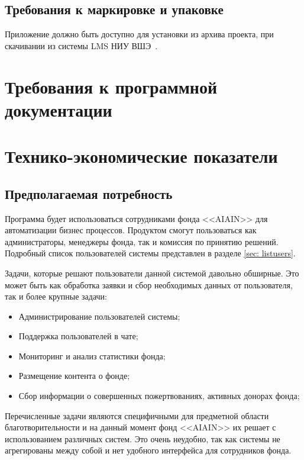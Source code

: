 \documentclass[a4paper,12pt,reqno]{article}
\begin{document}
	\subsection{Требования к маркировке и упаковке}
	Приложение должно быть доступно для установки из архива проекта, при скачивании из системы LMS НИУ ВШЭ~\cite{lms}.
	
						\newpage
	\section{Требования к программной документации}
    
	
						\newpage
	\section{Технико-экономические показатели}
	\subsection{Предполагаемая потребность}
	
	Программа будет использоваться сотрудниками фонда <<AIAIN>> для автоматизации бизнес процессов.  Продуктом смогут пользоваться как администраторы, менеджеры фонда, так и комиссия по принятию решений. Подробный список пользователей системы представлен в разделе \ref{sec: listusers}.

    Задачи, которые решают пользователи данной системой давольно обширные. Это может быть как обработка заявки и сбор необходимых данных от пользователя, так и более крупные задачи:

    \begin{itemize}
        \item Администрирование пользователей системы;
        \item Поддержка пользователей в чате;
        \item Мониторинг и анализ статистики фонда;
        \item Размещение контента о фонде;
        \item Сбор информации о совершенных пожертвованиях, активных донорах фонда; 
    \end{itemize}

    Перечисленные задачи являются специфичными для предметной области благотворительности и на данный момент фонд <<AIAIN>> их решает с использованием различных систем. Это очень неудобно, так как системы не агрегированы между собой и нет удобного интерфейса для сотрудников фонда.
\end{document}
